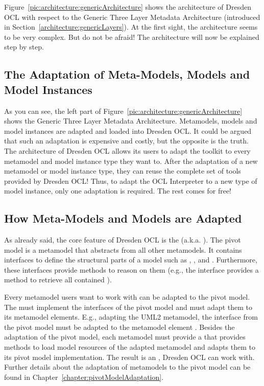 Figure~\ref{pic:architecture:genericArchitecture} shows the architecture of 
Dresden OCL with respect to the Generic Three Layer Metadata Architecture
(introduced in Section~\ref{architecture:genericLayers}). At the first sight, 
the architecture seems to be very complex. But do not be afraid! The 
architecture will now be explained step by step.


\subsection{The Adaptation of Meta-Models, Models and Model Instances}

As you can see, the left part of 
Figure~\ref{pic:architecture:genericArchitecture} shows the Generic Three Layer
Metadata Architecture. Metamodels, models and model instances are adapted and 
loaded into Dresden OCL. It could be argued that such an adaptation is expensive
and costly, but the opposite is the truth. The architecture of Dresden OCL allows
its users to adapt the toolkit to every metamodel and model instance type they 
want to. After the adaptation of a new metamodel or model instance type, they
can reuse the complete set of tools provided by Dresden OCL! Thus,
to adapt the \acs{OCL} Interpreter to a new type of model instance, only one 
adaptation is required. The rest comes for free!


\subsection{How Meta-Models and Models are Adapted}
\label{architecture:metaModelAdaptation}

As already said, the core feature of Dresden OCL is the 
(a.k.a. ). The pivot model is a metamodel that abstracts
from all other metamodels. It contains interfaces to define the structural 
parts of a model such as
, ,  and . 
Furthermore, these interfaces provide methods to reason on them (e.g., the 
interface  provides a method  to 
retrieve all contained ).

Every metamodel users want to work with can be adapted to the pivot model. The
 must implement the interfaces of the pivot model 
and must adapt them to its metamodel elements. E.g., adapting the \acs{UML}2 
metamodel, the interface  from the pivot model must be adapted to 
the metamodel element . Besides the adaptation of the pivot 
model, each metamodel must provide a  that provides 
methods to load model resources of the adapted metamodel and adapts them to 
its pivot model implementation. The result is an ,
Dresden OCL can work with. Further details about the adaptation of metamodels to
the pivot model can be found in Chapter~\ref{chapter:pivotModelAdaptation}.


